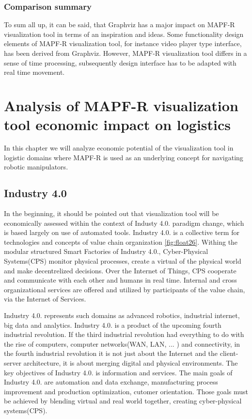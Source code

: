 \documentclass[thesis=B,english]{FITthesis}[2019/12/23]
\begin{document}
\subsection{Comparison summary}

To sum all up, it can be said, that Graphviz has a major impact on MAPF-R visualization tool in terms of an inspiration and ideas. Some functionality design elements of MAPF-R visualization tool, for instance video player type interface, has been derived from Graphviz. However, MAPF-R visualization tool differs in a sense of time processing, subsequently design interface has to be adapted with real time movement. 

\chapter{Analysis of MAPF-R visualization tool economic impact on logistics}

In this chapter we will analyze economic potential of the visualization tool in logistic domains where MAPF-R is used as an underlying concept for navigating robotic manipulators.

\section{Industry 4.0}

In the beginning, it should be pointed out that visualization tool will be economically assessed  within the context of Industy 4.0. paradigm change, which is based largely on use of automated tools. Industry 4.0. is a collective term for technologies and concepts of value chain organization \ref{fig:float26}. Withing the modular structured Smart Factories of Industry 4.0., Cyber-Physical Systems(CPS) monitor physical processes, create a virtual of the physical world and make decentrelized decisions. Over the Internet of Things, CPS cooperate and communicate with each other and humans in real time. Internal and cross organizational services are offered and utilized by participants of the value chain, via the Internet of Services. 
 
Industry 4.0. represents such domains as advanced robotics, industrial internet,
big data and analytics. Industry 4.0. is a product of the upcoming fourth industrial revolution. If the third industrial revolution had everything to do with the rise of computers, computer networks(WAN, LAN, ... ) and connectivity, in the fourth industrial revolution it is not just about the Internet and the client-server architecture, it is about merging digital and physical environments. The key objectives of Industry 4.0. is information and services. The main goals of Industry 4.0. are automation and data exchange, manufacturing process improvement and production optimization, cutomer orientation. Those goals must be achieved by blending virtual and real world together, creating cyber-physical systems(CPS). 
\end{document}
